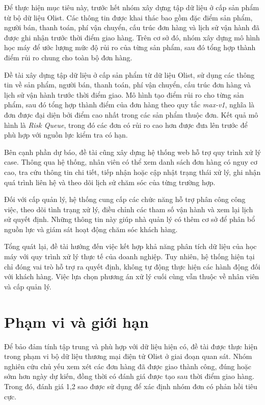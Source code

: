 \documentclass[12pt,a4paper]{report}
\begin{document}
Để thực hiện mục tiêu này, trước hết nhóm xây dựng tập dữ liệu ở cấp sản phẩm từ bộ dữ liệu Olist. Các thông tin được khai thác bao gồm đặc điểm sản phẩm, người bán, thanh toán, phí vận chuyển, cấu trúc đơn hàng và lịch sử vận hành đã được ghi nhận trước thời điểm giao hàng. Trên cơ sở đó, nhóm xây dựng mô hình học máy để ước lượng mức độ rủi ro của từng sản phẩm, sau đó tổng hợp thành điểm rủi ro chung cho toàn bộ đơn hàng.

Đề tài xây dựng tập dữ liệu ở cấp sản phẩm từ dữ liệu Olist, sử dụng các thông tin về sản phẩm, người bán, thanh toán, phí vận chuyển, cấu trúc đơn hàng và lịch sử vận hành trước thời điểm giao. Mô hình tạo điểm rủi ro cho từng sản phẩm, sau đó tổng hợp thành điểm của đơn hàng theo quy tắc \emph{max-v1}, nghĩa là đơn được đại diện bởi điểm cao nhất trong các sản phẩm thuộc đơn. Kết quả mô hình là \emph{Risk Queue}, trong đó các đơn có rủi ro cao hơn được đưa lên trước để phù hợp với nguồn lực kiểm tra có hạn.

Bên cạnh phần dự báo, đề tài cũng xây dựng hệ thống web hỗ trợ quy trình xử lý case. Thông qua hệ thống, nhân viên có thể xem danh sách đơn hàng có nguy cơ cao, tra cứu thông tin chi tiết, tiếp nhận hoặc cập nhật trạng thái xử lý, ghi nhận quá trình liên hệ và theo dõi lịch sử chăm sóc của từng trường hợp.

Đối với cấp quản lý, hệ thống cung cấp các chức năng hỗ trợ phân công công việc, theo dõi tình trạng xử lý, điều chỉnh các tham số vận hành và xem lại lịch sử quyết định. Những thông tin này giúp nhà quản lý có thêm cơ sở để phân bổ nguồn lực và giám sát hoạt động chăm sóc khách hàng.

Tổng quát lại, đề tài hướng đến việc kết hợp khả năng phân tích dữ liệu của học máy với quy trình xử lý thực tế của doanh nghiệp. Tuy nhiên, hệ thống hiện tại chỉ đóng vai trò hỗ trợ ra quyết định, không tự động thực hiện các hành động đối với khách hàng. Việc lựa chọn phương án xử lý cuối cùng vẫn thuộc về nhân viên và cấp quản lý.

\section{Phạm vi và giới hạn}
\label{sec:pham-vi}

Để bảo đảm tính tập trung và phù hợp với dữ liệu hiện có, đề tài được thực hiện trong phạm vi bộ dữ liệu thương mại điện tử Olist ở giai đoạn quan sát. Nhóm nghiên cứu chủ yếu xem xét các đơn hàng đã được giao thành công, đúng hoặc sớm hơn ngày dự kiến, đồng thời có đánh giá được tạo sau thời điểm giao hàng. Trong đó, đánh giá 1,2 sao được sử dụng để xác định nhóm đơn có phản hồi tiêu cực.
\end{document}

